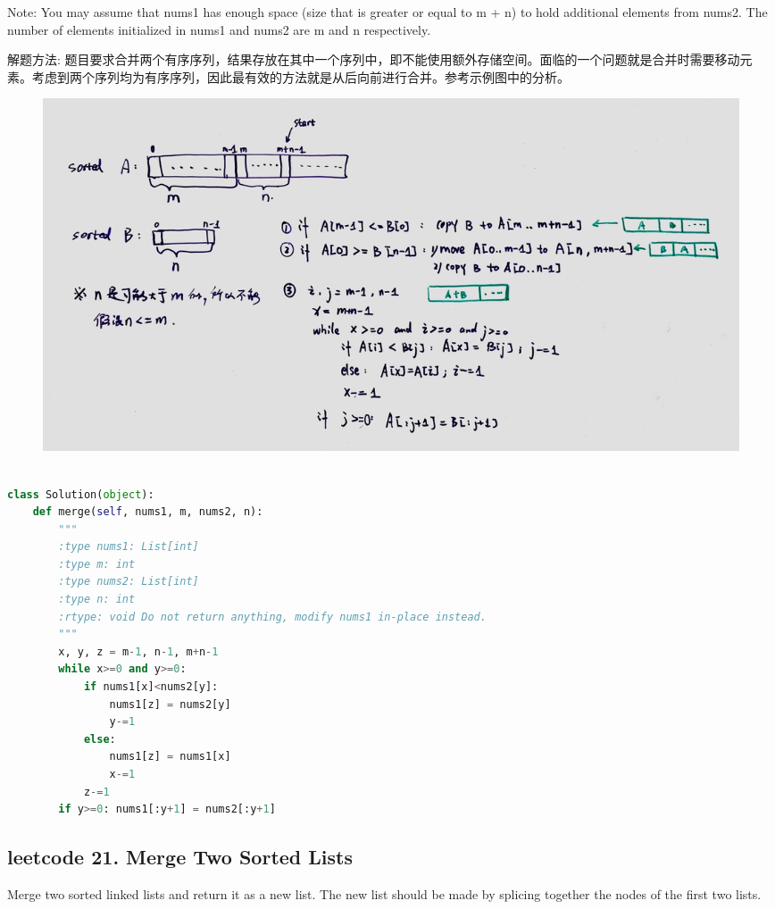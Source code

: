\documentclass[a4paper,10pt]{article}
\begin{document}
\noindent Note: You may assume that nums1 has enough space (size that is greater or equal to m + n) to hold additional elements from nums2. The number of elements initialized in nums1 and nums2 are m and n respectively. \\

\begin{CJK*}{UTF8}{gbsn}
\noindent 解题方法: 题目要求合并两个有序序列，结果存放在其中一个序列中，即不能使用额外存储空间。面临的一个问题就是合并时需要移动元素。考虑到两个序列均为有序序列，因此最有效的方法就是从后向前进行合并。参考示例图中的分析。
\end{CJK*}

\begin{figure}[h]
    \includegraphics[width=1\textwidth]{leetcode88.jpg}
    \centering\\
\end{figure}

\begin{lstlisting}[language=Python, caption=Problem88. Merge Sorted Array]

class Solution(object):
    def merge(self, nums1, m, nums2, n):
        """
        :type nums1: List[int]
        :type m: int
        :type nums2: List[int]
        :type n: int
        :rtype: void Do not return anything, modify nums1 in-place instead.
        """
        x, y, z = m-1, n-1, m+n-1
        while x>=0 and y>=0:
            if nums1[x]<nums2[y]:
                nums1[z] = nums2[y]
                y-=1
            else:
                nums1[z] = nums1[x]
                x-=1
            z-=1
        if y>=0: nums1[:y+1] = nums2[:y+1]
\end{lstlisting}


\subsection{leetcode 21. Merge Two Sorted Lists}
Merge two sorted linked lists and return it as a new list. The new list should be made by splicing together the nodes of the first two lists. \\
\end{document}
